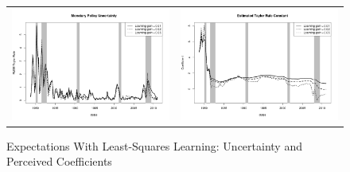 \documentclass[12pt]{article}
\begin{document}
\begin{figure}\caption{Expectations With Least-Squares Learning: Uncertainty and Perceived Coefficients}\label{fg:coefs_ls}\vspace*{1pc}
\hspace*{-0.6in}\begin{tabular}{cc}
\includegraphics[scale=0.4]{mpu_ols.png} & \includegraphics[scale=0.4]{coef_constant_ols.png} \\ [1pc]

\end{tabular}
\end{figure}
\end{document}
